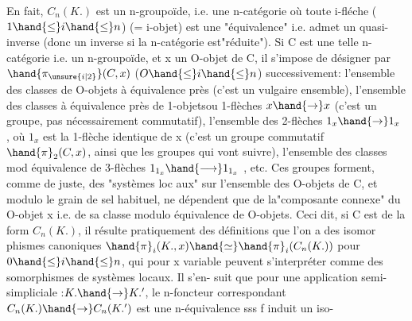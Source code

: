 En fait, $C_n(K.)$ est un n-groupoïde, i.e. une n-catégorie où toute
i-fléche ($1\hand{\leq} i\hand{\leq} n$) (= i-objet) est une "équivalence" i.e. admet un quasi-%
inverse (donc un inverse si la n-catégorie est"réduite"). Si C est une
telle n-catégorie i.e. un n-groupoïde, et x un O-objet de C, il s'impose
de désigner par $\hand{\pi_{\unsure{i|2}}}(C,x)$ ($O\hand{\leq} i\hand{\leq} n$) successivement: l'ensemble des classes
de O-objets à équivalence près (c'est un vulgaire ensemble), l'ensemble des
classes à équivalence près de 1-objets\hand{(}ou 1-flèches\hand{)} $x \hand{\to} x$ (c'est un groupe,
pas nécessairement commutatif), l'ensemble des  2-flèches $1_x \hand{\to} 1_x$ , où $1_x$
est la 1-flèche identique de x (c'est un groupe commutatif $\hand{\pi}_2(C,x)$, ainsi
que les groupes qui vont suivre), l'ensemble des classes mod équivalence
de 3-flèches $1_{1_x} \hand{\longrightarrow} 1_{1_x}$ , etc. Ces groupes forment, comme de juste, des
"systèmes loc aux" sur l'ensemble des O-objets de C, et modulo le grain de
sel habituel,  ne dépendent que de la"composante connexe" du O-objet x i.e.
de sa classe modulo équivalence de O-objets. Ceci dit, si C est de la form
$C_n(K.)$, il résulte pratiquement des définitions que  l'on a des isomor%
phismes canoniques $\hand{\pi}_i(K.,x)\hand{\simeq}\hand{\pi}_i(C_n(K.))$ pour $0\hand{\leq} i\hand{\leq} n$, qui pour x variable
peuvent s'interpréter comme des somorphismes de systèmes locaux. Il s'en-%
suit que pour une application semi-simpliciale :$K. \hand{\to} K.'$, le n-foncteur
correspondant $C_n(K.) \hand{\to} C_n(K.')$ est une n-équivalence sss f induit un iso-%

